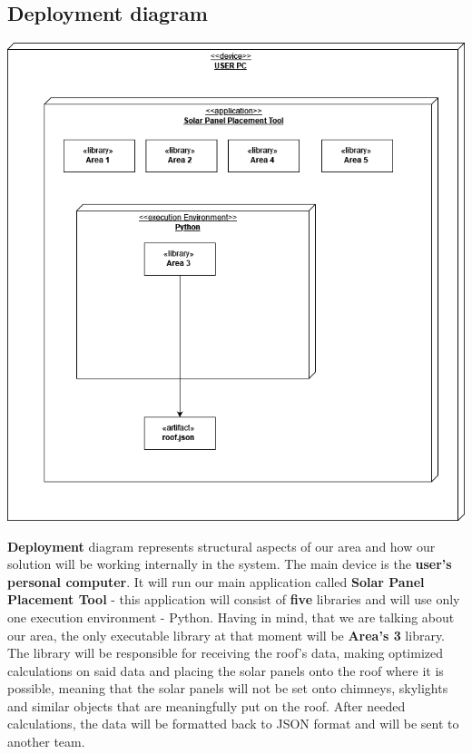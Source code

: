 \documentclass[a4paper,12pt,fleqn]{article}
\begin{document}
\subsection{Deployment diagram}
\begin{center}
    \includegraphics[scale=0.4]{main/images/deployment3.png}
\end{center}
\textbf{Deployment} diagram represents structural aspects of our area and how our solution will be working internally in the system. The main device is the \textbf{user's personal computer}. It will run our main application called \textbf{Solar Panel Placement Tool} - this application will consist of \textbf{five} libraries and will use only one execution environment - Python. Having in mind, that we are talking about our area, the only executable library at that moment will be \textbf{Area's 3} library. The library will be responsible for receiving the roof's data, making optimized calculations on said data and placing the solar panels onto the roof where it is possible, meaning that the solar panels will not be set onto chimneys, skylights and similar objects that are meaningfully put on the roof. After needed calculations, the data will be formatted back to JSON format and will be sent to another team.
\end{document}
